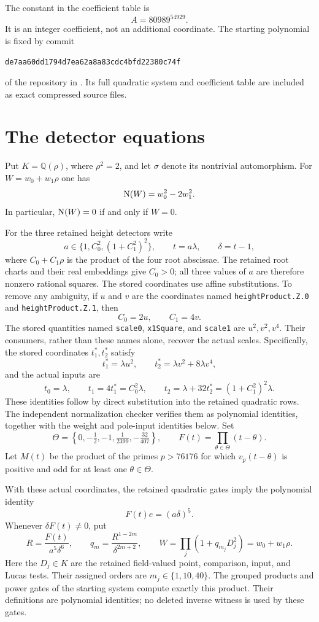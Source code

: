 \documentclass[11pt,a4paper]{article}
\theoremstyle{remark}\newtheorem{remark}[theorem]{Remark}
\newcommand{\Q}{\mathbb Q}\newcommand{\Z}{\mathbb Z}
\begin{document}
The constant in the coefficient table is
\[
                         A=80989^{54929}.
\]
It is an integer coefficient, not an additional coordinate. The starting
polynomial is fixed by commit
\begin{center}\small
\nolinkurl{de7aa60dd1794d7ea62a8a83cdc4bfd22380c74f}
\end{center}
of the repository in \cite{Construction392}. Its full quadratic system
and coefficient table are included as exact compressed source files.

\section{The detector equations}
Put $K=\Q(\rho)$, where $\rho^2=2$, and let $\sigma$ denote its
nontrivial automorphism. For $W=w_0+w_1\rho$ one has
\[
                       \operatorname{N}(W)=w_0^2-2w_1^2.
\]
In particular, $\operatorname{N}(W)=0$ if and only if $W=0$.

For the three retained height detectors write
\[
 a\in\{1,C_0^2,(1+C_1^2)^2\},\qquad t=a\lambda,
 \qquad\delta=t-1,
\]
where $C_0+C_1\rho$ is the product of the four root abscissae.
The retained root charts and their real embeddings give $C_0>0$;
all three values of $a$ are therefore nonzero rational squares.
The stored coordinates use affine substitutions. To remove any
ambiguity, if $u$ and $v$ are the coordinates named
\nolinkurl{heightProduct.Z.0} and \nolinkurl{heightProduct.Z.1}, then
\[
 C_0=2u,\qquad C_1=4v.
\]
The stored quantities named \nolinkurl{scale0},
\nolinkurl{x1Square}, and \nolinkurl{scale1} are $u^2,v^2,v^4$.
Their consumers, rather than these names alone, recover the actual
scales. Specifically, the stored coordinates $t_1^*,t_2^*$ satisfy
\[
 t_1^*=\lambda u^2,\qquad
 t_2^*=\lambda v^2+8\lambda v^4,
\]
and the actual inputs are
\[
 t_0=\lambda,\qquad t_1=4t_1^*=C_0^2\lambda,
 \qquad t_2=\lambda+32t_2^*=(1+C_1^2)^2\lambda.
\]
These identities follow by direct substitution into the retained
quadratic rows. The independent normalization checker verifies them
as polynomial identities, together with the weight and pole-input
identities below.
Set
\[
 \Theta=\left\{0,-\tfrac12,-1,\tfrac1{2399},-\tfrac{32}{407}\right\},
 \qquad F(t)=\prod_{\theta\in\Theta}(t-\theta).
\]
Let $M(t)$ be the product of the primes $p>76176$ for which
$v_p(t-\theta)$ is positive and odd for at least one
$\theta\in\Theta$.

With these actual coordinates, the retained quadratic gates imply
the polynomial identity
\begin{equation}\label{eq:e}
                            F(t)e=(a\delta)^5.
\end{equation}
Whenever $\delta F(t)\ne0$, put
\[
 R=\frac{F(t)}{a^5\delta^6},\qquad
 q_m=\frac{R^{1-2m}}{\delta^{2m+2}},
 \qquad
 W=\prod_j(1+q_{m_j}D_j^2)=w_0+w_1\rho.
\]
Here the $D_j\in K$ are the retained field-valued point, comparison,
input, and Lucas tests. Their assigned orders are $m_j\in\{1,10,40\}$.
The grouped products and power gates of the starting system compute
exactly this product. Their definitions are polynomial identities;
no deleted inverse witness is used by these gates.
\end{document}
